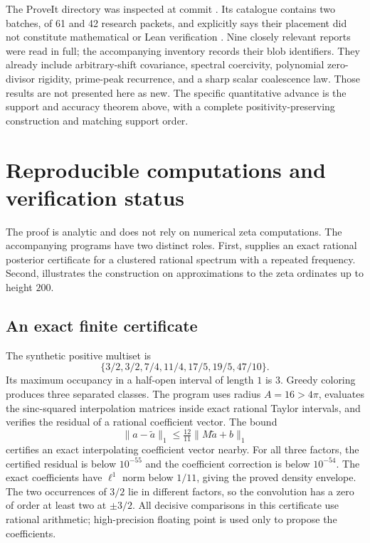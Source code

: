 \documentclass[11pt]{article}
\theoremstyle{remark}\newtheorem{remark}[theorem]{Remark}
\begin{document}
The ProveIt directory was inspected at commit
.
Its catalogue contains two batches, of 61 and 42 research packets, and
explicitly says their placement did not constitute mathematical or Lean
verification \cite{catalogue}. Nine closely relevant reports were read
in full; the accompanying inventory records their blob identifiers.
They already include arbitrary-shift covariance, spectral coercivity,
polynomial zero-divisor rigidity, prime-peak recurrence, and a sharp
scalar coalescence law. Those results are not presented here as new.
The specific quantitative advance is the support and accuracy theorem
above, with a complete positivity-preserving construction and matching
support order.




\section{Reproducible computations and verification status}

The proof is analytic and does not rely on numerical zeta computations.
The accompanying programs have two distinct roles. First,
 supplies an exact rational posterior
certificate for a clustered rational spectrum with a repeated frequency.
Second,  illustrates the construction
on approximations to the zeta ordinates up to height $200$.

\subsection{An exact finite certificate}

The synthetic positive multiset is
\[
 \{3/2,3/2,7/4,11/4,17/5,19/5,47/10\}.
\]
Its maximum occupancy in a half-open interval of length $1$ is $3$.
Greedy coloring produces three separated classes. The program uses
radius $A=16>4\pi$, evaluates the sinc-squared interpolation matrices
inside exact rational Taylor intervals, and verifies the residual of a
rational coefficient vector. The bound
\[
 \|a-\widetilde a\|_1\le\tfrac{12}{11}
          \|M\widetilde a+b\|_1
\]
certifies an exact interpolating coefficient vector nearby. For all
three factors, the certified residual is below $10^{-55}$ and the
coefficient correction is below $10^{-54}$. The exact coefficients have
$\ell^1$ norm below $1/11$, giving the proved density envelope.
The two occurrences of $3/2$ lie in different factors, so the convolution
has a zero of order at least two at $\pm3/2$.
All decisive comparisons in this certificate use rational arithmetic;
high-precision floating point is used only to propose the coefficients.
\end{document}
